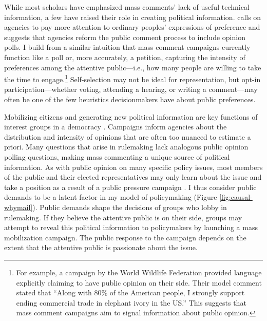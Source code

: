 While most scholars have emphasized mass comments' lack of useful technical information, a few have raised their role in creating political information. \citet{Cuellar2005} calls on agencies to pay more attention to ordinary peoples' expressions of preference and \citet{Rauch2016} suggests that agencies reform the public comment process to include opinion polls. I build from a similar intuition that mass comment campaigns currently function like a poll or, more accurately, a petition, capturing the intensity of preferences among the attentive public---i.e., how many people are willing to take the time to engage.\footnote{
For example, a campaign by the World Wildlife Federation provided language explicitly claiming to have public opinion on their side. Their model comment stated that ``Along with 80\% of the American people, I strongly support ending commercial trade in elephant ivory in the US.'' This suggests that mass comment campaigns aim to signal information about public opinion.
} 
Self-selection may not be ideal for representation, but opt-in participation---whether voting, attending a hearing, or writing a comment---may often be one of the few heuristics decisionmakers have about public preferences. 

Mobilizing citizens and generating new political information are key functions of interest groups in a democracy \citep{Mansbridge1992, Mahoney2007}. %
Campaigns inform agencies about the distribution and intensity of opinions that are often too nuanced to estimate a priori. Many questions that arise in rulemaking lack analogous public opinion polling questions, making mass commenting a unique source of political information. 
As with public opinion on many specific policy issues,  most members of the public and their elected representatives may only learn about the issue and take a position as a result of a public pressure campaign \citep{Hutchings2003}. I thus consider public demands to be a latent factor in my model of policymaking (Figure \ref{fig:causal-whymail}). Public demands shape the decisions of groups who lobby in rulemaking. If they believe the attentive public is on their side, groups may attempt to reveal this political information to policymakers by launching a mass mobilization campaign. The public response to the campaign depends on the extent that the attentive public is passionate about the issue.%


